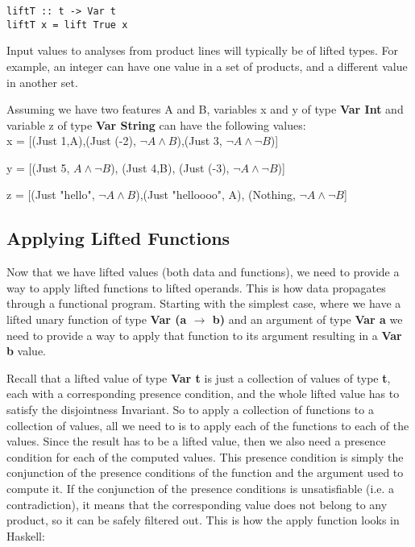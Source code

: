 \documentclass[10pt,conference]{llncs}
\begin{document}
\begin{verbatim}
liftT :: t -> Var t
liftT x = lift True x
\end{verbatim}

Input values to analyses from product lines will typically be of lifted types. For example, an integer can have one value in a set of products, and a different value in another set. 

\begin{exmp}

Assuming we have two features A and B, variables x and y of type \textbf{Var Int} and variable z of type \textbf{Var String} can have the following values: \\

x = [(Just 1,A),(Just (-2), $\neg A \wedge B$),(Just 3, $\neg A \wedge \neg B$)]

y = [(Just 5, $A \wedge \neg B$), (Just 4,B), (Just (-3), $\neg A \wedge \neg B$)]

z = [(Just "hello", $\neg A \wedge B$),(Just "helloooo", A), (Nothing, $\neg A \wedge \neg B$] \\

\end{exmp}

\subsection{Applying Lifted Functions}

Now that we have lifted values (both data and functions), we need to provide a way to apply lifted functions to lifted operands. This is how data propagates through a functional program. Starting with the simplest case, where we have a lifted unary function of type \textbf{Var (a $\to$ b)} and an argument of type \textbf{Var a} we need to provide a way to apply that function to its argument resulting in a \textbf{Var b} value.

Recall that a lifted value of type \textbf{Var t} is just a collection of values of type \textbf{t}, each with a corresponding presence condition, and the whole lifted value has to satisfy the disjointness Invariant. So to apply a collection of functions to a collection of values, all we need to is to apply each of the functions to each of the values. Since the result has to be a lifted value, then we also need a presence condition for each of the computed values. This presence condition is simply the conjunction of the presence conditions of the function and the argument used to compute it. If the conjunction of the presence conditions is unsatisfiable (i.e. a contradiction), it means that the corresponding value does not belong to any product, so it can be safely filtered out. This is how the apply function looks in Haskell:
\end{document}
